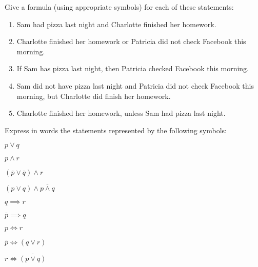 \documentclass[12pt]{article}
\begin{document}
\begin{qu}
Give a formula (using appropriate symbols) for each of these statements:
\begin{enumerate}[label=\alph*)]
\item Sam had pizza last night and Charlotte finished her homework.
\item Charlotte finished her homework or Patricia did not check Facebook this morning.
\item If Sam has pizza last night, then Patricia checked Facebook this morning.
\item Sam did not have pizza last night and Patricia did not check Facebook this morning, but Charlotte did finish her homework.
\item Charlotte finished her homework, unless Sam had pizza last night.
\end{enumerate}
\end{qu}

\begin{qu}
Express in words the statements represented by the following symbols:

\begin{inparaenum}[a)]
\item $p \lor q$
\tab \item $p \land r$
\tab \item $(\overline{p} \lor \overline{q}) \land r$
\tab \item $ (p \lor q) \land \overline{p \land q}$
\tab \item $q \implies r$
\tab \item $\overline{p} \implies q$
\tab \item $p \iff r$
\tab \item $\overline{p} \iff (q \lor r)$
\tab \item $r \iff \overline{ (p \lor q)}$
\end{inparaenum}

\end{qu}
\end{document}

